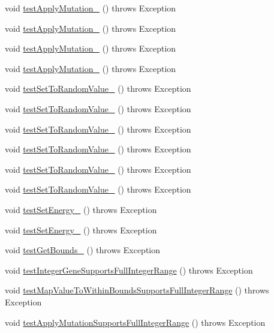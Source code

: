 \begin{DoxyCompactItemize}
void \hyperlink{classorg_1_1jgap_1_1impl_1_1_integer_gene_test_ac3a7fd05966b04527cf6645b5387c63c}{test\-Apply\-Mutation\-\_} ()  throws Exception 
\item 
void \hyperlink{classorg_1_1jgap_1_1impl_1_1_integer_gene_test_a731ef5071bffc02b090a266641896a39}{test\-Apply\-Mutation\-\_} ()  throws Exception 
\item 
void \hyperlink{classorg_1_1jgap_1_1impl_1_1_integer_gene_test_a2c780e9444cc152ffc3b3ea0f6831cc3}{test\-Apply\-Mutation\-\_} ()  throws Exception 
\item 
void \hyperlink{classorg_1_1jgap_1_1impl_1_1_integer_gene_test_a4b0c2934691bd07dbbc67d1047fb3ef5}{test\-Apply\-Mutation\-\_} ()  throws Exception 
\item 
void \hyperlink{classorg_1_1jgap_1_1impl_1_1_integer_gene_test_a6bda8e455f1c69ae53bfe2c5e68f4141}{test\-Set\-To\-Random\-Value\-\_} ()  throws Exception 
\item 
void \hyperlink{classorg_1_1jgap_1_1impl_1_1_integer_gene_test_afd2bcd03479b8ad2ba6e9652eb4df483}{test\-Set\-To\-Random\-Value\-\_} ()  throws Exception 
\item 
void \hyperlink{classorg_1_1jgap_1_1impl_1_1_integer_gene_test_adbe9a8fca1e79bf25fc85d03de25260f}{test\-Set\-To\-Random\-Value\-\_} ()  throws Exception 
\item 
void \hyperlink{classorg_1_1jgap_1_1impl_1_1_integer_gene_test_a9201daa968387fb52ecd93ef817f4e3c}{test\-Set\-To\-Random\-Value\-\_} ()  throws Exception 
\item 
void \hyperlink{classorg_1_1jgap_1_1impl_1_1_integer_gene_test_a0d85aad99120ec7d20057a8c20d97d83}{test\-Set\-To\-Random\-Value\-\_} ()  throws Exception 
\item 
void \hyperlink{classorg_1_1jgap_1_1impl_1_1_integer_gene_test_a37f9978f191a94f289db2d59a0c6e81e}{test\-Set\-To\-Random\-Value\-\_} ()  throws Exception 
\item 
void \hyperlink{classorg_1_1jgap_1_1impl_1_1_integer_gene_test_acb024368bf438141c837793089af4ca7}{test\-Set\-Energy\-\_} ()  throws Exception 
\item 
void \hyperlink{classorg_1_1jgap_1_1impl_1_1_integer_gene_test_abc7de81ace1472e146b815ccd2ff0b33}{test\-Set\-Energy\-\_} ()  throws Exception 
\item 
void \hyperlink{classorg_1_1jgap_1_1impl_1_1_integer_gene_test_a960a1c0047255716026fb60d0d04a850}{test\-Get\-Bounds\-\_} ()  throws Exception 
\item 
void \hyperlink{classorg_1_1jgap_1_1impl_1_1_integer_gene_test_a24f9726db25a7c036fb45c26dde82eaf}{test\-Integer\-Gene\-Supports\-Full\-Integer\-Range} ()  throws Exception 
\item 
void \hyperlink{classorg_1_1jgap_1_1impl_1_1_integer_gene_test_a3c038eb59a6c5a9b6cd1f3940a88b76d}{test\-Map\-Value\-To\-Within\-Bounds\-Supports\-Full\-Integer\-Range} ()  throws Exception 
\item 
void \hyperlink{classorg_1_1jgap_1_1impl_1_1_integer_gene_test_af4c01df7bd175523c24a4023a68e26f2}{test\-Apply\-Mutation\-Supports\-Full\-Integer\-Range} ()  throws Exception 
\end{DoxyCompactItemize}
